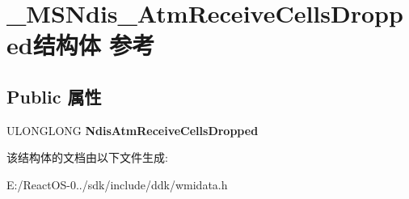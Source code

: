 \hypertarget{struct___m_s_ndis___atm_receive_cells_dropped}{}\section{\+\_\+\+M\+S\+Ndis\+\_\+\+Atm\+Receive\+Cells\+Dropped结构体 参考}
\label{struct___m_s_ndis___atm_receive_cells_dropped}
\subsection*{Public 属性}
\begin{DoxyCompactItemize}
\item 
\mbox{\label{struct___m_s_ndis___atm_receive_cells_dropped_a7c7a8141edda7d2e047d4bdd80d395ec}} 
U\+L\+O\+N\+G\+L\+O\+NG {\bfseries Ndis\+Atm\+Receive\+Cells\+Dropped}
\end{DoxyCompactItemize}


该结构体的文档由以下文件生成\+:\begin{DoxyCompactItemize}
\item 
E\+:/\+React\+O\+S-\/0../sdk/include/ddk/wmidata.\+h\end{DoxyCompactItemize}
